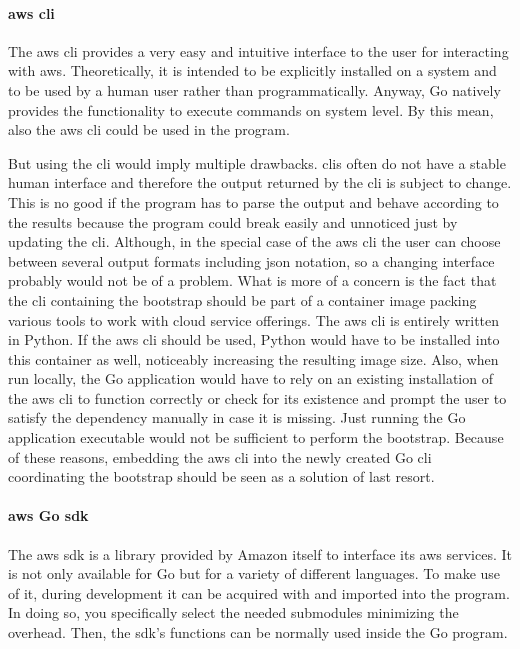 \paragraph{\ac{aws} \ac{cli}}
The \ac{aws} \ac{cli} provides a very easy and intuitive interface to the user for interacting with \ac{aws}.
Theoretically, it is intended to be explicitly installed on a system and to be used by a human user rather than programmatically.
Anyway, Go natively provides the functionality to execute commands on system level.
By this mean, also the \ac{aws} \ac{cli} could be used in the program.

But using the \ac{cli} would imply multiple drawbacks.
\acp{cli} often do not have a stable human interface and therefore the output returned by the \ac{cli} is subject to change.
This is no good if the program has to parse the output and behave according to the results because the program could break easily and unnoticed just by updating the \ac{cli}.
Although, in the special case of the \ac{aws} \ac{cli} the user can choose between several output formats including \ac{json} notation, so a changing interface probably would not be of a problem.
What is more of a concern is the fact that the \ac{cli} containing the bootstrap should be part of a container image packing various tools to work with cloud service offerings.
The \ac{aws} \ac{cli} is entirely written in Python.
If the \ac{aws} \ac{cli} should be used, Python would have to be installed into this container as well, noticeably increasing the resulting image size.
Also, when run locally, the Go application would have to rely on an existing installation of the \ac{aws} \ac{cli} to function correctly or check for its existence and prompt the user to satisfy the dependency manually in case it is missing.
Just running the Go application executable would not be sufficient to perform the bootstrap.
Because of these reasons, embedding the \ac{aws} \ac{cli} into the newly created Go \ac{cli} coordinating the bootstrap should be seen as a solution of last resort.

\paragraph{\ac{aws} Go \acs*{sdk}}
The \ac{aws} \ac{sdk} is a library provided by Amazon itself to interface its \ac{aws} services.
It is not only available for Go but for a variety of different languages.
To make use of it, during development it can be acquired with  and imported into the program.
In doing so, you specifically select the needed submodules minimizing the overhead.
Then, the \ac{sdk}'s functions can be normally used inside the Go program.

